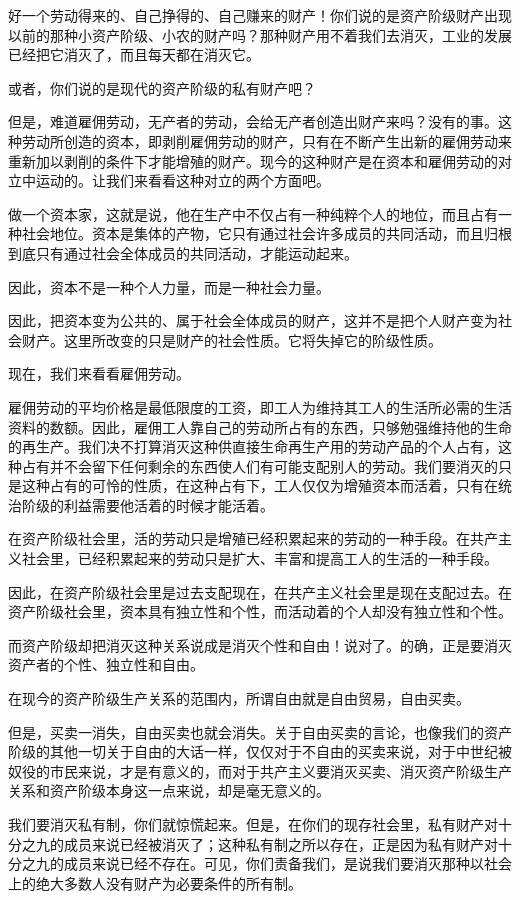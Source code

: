 \documentclass[10pt, UTF8]{book} %
\begin{document}
好一个劳动得来的、自己挣得的、自己赚来的财产！你们说的是资产阶级财产出现以前的那种小资产阶级、小农的财产吗？那种财产用不着我们去消灭，工业的发展已经把它消灭了，而且每天都在消灭它。

或者，你们说的是现代的资产阶级的私有财产吧？

但是，难道雇佣劳动，无产者的劳动，会给无产者创造出财产来吗？没有的事。这种劳动所创造的资本，即剥削雇佣劳动的财产，只有在不断产生出新的雇佣劳动来重新加以剥削的条件下才能增殖的财产。现今的这种财产是在资本和雇佣劳动的对立中运动的。让我们来看看这种对立的两个方面吧。

做一个资本家，这就是说，他在生产中不仅占有一种纯粹个人的地位，而且占有一种社会地位。资本是集体的产物，它只有通过社会许多成员的共同活动，而且归根到底只有通过社会全体成员的共同活动，才能运动起来。

因此，资本不是一种个人力量，而是一种社会力量。

因此，把资本变为公共的、属于社会全体成员的财产，这并不是把个人财产变为社会财产。这里所改变的只是财产的社会性质。它将失掉它的阶级性质。

现在，我们来看看雇佣劳动。

雇佣劳动的平均价格是最低限度的工资，即工人为维持其工人的生活所必需的生活资料的数额。因此，雇佣工人靠自己的劳动所占有的东西，只够勉强维持他的生命的再生产。我们决不打算消灭这种供直接生命再生产用的劳动产品的个人占有，这种占有并不会留下任何剩余的东西使人们有可能支配别人的劳动。我们要消灭的只是这种占有的可怜的性质，在这种占有下，工人仅仅为增殖资本而活着，只有在统治阶级的利益需要他活着的时候才能活着。

在资产阶级社会里，活的劳动只是增殖已经积累起来的劳动的一种手段。在共产主义社会里，已经积累起来的劳动只是扩大、丰富和提高工人的生活的一种手段。

因此，在资产阶级社会里是过去支配现在，在共产主义社会里是现在支配过去。在资产阶级社会里，资本具有独立性和个性，而活动着的个人却没有独立性和个性。

而资产阶级却把消灭这种关系说成是消灭个性和自由！说对了。的确，正是要消灭资产者的个性、独立性和自由。

在现今的资产阶级生产关系的范围内，所谓自由就是自由贸易，自由买卖。

但是，买卖一消失，自由买卖也就会消失。关于自由买卖的言论，也像我们的资产阶级的其他一切关于自由的大话一样，仅仅对于不自由的买卖来说，对于中世纪被奴役的市民来说，才是有意义的，而对于共产主义要消灭买卖、消灭资产阶级生产关系和资产阶级本身这一点来说，却是毫无意义的。

我们要消灭私有制，你们就惊慌起来。但是，在你们的现存社会里，私有财产对十分之九的成员来说已经被消灭了；这种私有制之所以存在，正是因为私有财产对十分之九的成员来说已经不存在。可见，你们责备我们，是说我们要消灭那种以社会上的绝大多数人没有财产为必要条件的所有制。
\end{document}

